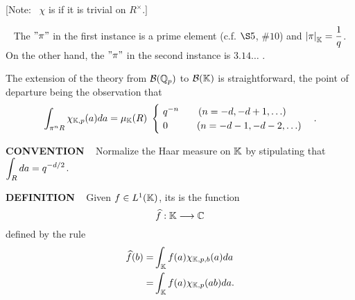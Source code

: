 [Note: \  $\chi$ is  if it is trivial on $R^\times$.$]$


\begin{x}{\small\bf {}} \ %
The $"\pi"$ in the first instance is a prime element (c.f. $\S 5$, $\# 10$) and $\left\vert\pi\right\vert_{\mathbb{K}} = \displaystyle\frac{1}{q}$.  
On the other hand, the $"\pi"$ in the second instance is $3.14\ldots$ .

\vspace{0.4cm}

The extension of the theory  from $\mathcal{B}(\mathbb{Q}_p)$ to $\mathcal{B}(\mathbb{K})$ is straightforward, the point of departure being the observation that
\[
\int_{\pi^nR} \chi_{\K,p}(a) da = \mu_\K(R) \ 
\begin{cases}
\ q^{-n} \qquad (n = -d, -d+1, \ldots)\\
\  0 \qquad \quad (n = -d-1, -d-2, \ldots)
\end{cases}
.
\]
\end{x}

\vspace{0.1cm}

\begin{x}{\small\bf CONVENTION} \ %
Normalize the Haar measure on $\mathbb{K}$ by stipulating that $\displaystyle\int_R da = q^{-d/2}$.
\end{x}

\vspace{0.1cm}

\begin{x}{\small\bf DEFINITION} \ %
Given $f \in L^1(\mathbb{K})$, its 
is the function 
\[
\widehat{f}:\mathbb{K} \longrightarrow \mathbb{C}
\]
defined by the rule
\[
\begin{aligned}
\widehat{f}(b)	
=&  \int_{\mathbb{K}} f(a) \chi_{\mathbb{K},p,b} (a) da\\	
=&  \int_{\mathbb{K}} f(a) \chi_{\mathbb{K},p} (ab) da.
\end{aligned}
\]
\end{x}

\vspace{0.2cm}

